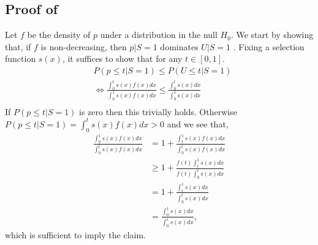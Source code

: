\documentclass{article}
\begin{document}
\begin{appendix}
\subsection{Proof of }
Let $f$ be the density of $p$ under a distribution in the null $H_0$. We start by showing that, if $f$ is non-decreasing, then $p |S =1$ dominates $U | S=1$ . Fixing a selection function $s(x)$, it suffices to show that for any $t \in [0, 1]$. 
    \begin{align*}
        &P(p \leq t | S =1) \leq P(U \leq t | S= 1)\\
        &\iff 
        \frac{\int_{0}^{t} s(x) f(x) dx }{\int_{0}^{1} s(x) f(x) dx } \leq \frac{\int_{0}^{t} s(x) dx}{\int_{0}^{1} s(x) dx } \\
    \end{align*}
If $P( p \leq t | S = 1)$ is zero then this trivially holds. Otherwise $P( p \leq t | S = 1) = \int_{0}^{t} s(x) f(x) dx  > 0$ and we see that, 
    \begin{align*}
        \frac{ \int_{0}^{1} s(x) f(x) dx }{\int_{0}^{t} s(x) f(x) dx } &= 1 + \frac{\int_{t}^{1} s(x) f(x) dx }{\int_{0}^{t} s(x) f(x) dx }\\
        &\geq 1 + \frac{f(t)\int_{t}^{1} s(x) dx }{f(t)\int_{0}^{t} s(x)  dx }\\
        &= 1 + \frac{\int_{t}^{1} s(x) dx }{\int_{0}^{t} s(x)  dx }\\
        &= \frac{ \int_{0}^{1} s(x) dx }{\int_{0}^{t} s(x)  dx },
    \end{align*}
which is sufficient to imply the claim. 


\end{appendix}
\end{document}
